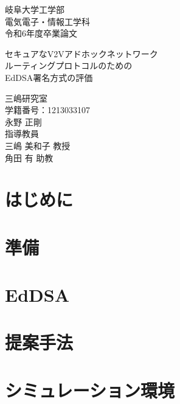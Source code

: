 \documentclass[
  luatex,
  paper=a4paper,
  fontsize=11pt,
  report,
  jlreq_notes,
]{jlreq}
\begin{document}
\begin{titlepage}
  \centering

  {\Large
    岐阜大学工学部 \\ [0.5em]
    電気電子・情報工学科 \\ [0.5em]
    令和6年度卒業論文 \\
  } 
  \vspace{8em} 

  {\huge
    セキュアなV2Vアドホックネットワーク \\
    ルーティングプロトコルのための \\
    EdDSA署名方式の評価 \\
  }
  \vspace{10em}

  \LARGE 三嶋研究室 \\ [0.5em]
  \Large 学籍番号：1213033107 \\ 
  \huge 永野 正剛 \\ [0.5em]
  \Large 指導教員 \\
  \LARGE 三嶋 美和子 教授 \\
  \LARGE 角田 有 助教 \\

  \vfill 
\end{titlepage}

\tableofcontents

\clearpage

\chapter*{はじめに}

\chapter[　　 準備]{準備}

\chapter[　　 EdDSA]{EdDSA}

\chapter[　　 提案手法]{提案手法}

\chapter[　　 シミュレーション環境]{シミュレーション環境}

\end{document}
